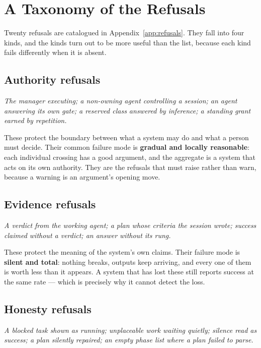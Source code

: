 \documentclass[11pt]{article}
\begin{document}
\section{A Taxonomy of the Refusals}
\label{sec:taxonomy}

Twenty refusals are catalogued in Appendix~\ref{app:refusals}. They fall into four kinds, and the kinds turn out to be more useful than the list, because each kind fails differently when it is absent.

\subsection{Authority refusals}

\emph{The manager executing; a non-owning agent controlling a session; an agent answering its own gate; a reserved class answered by inference; a standing grant earned by repetition.}

These protect the boundary between what a system may do and what a person must decide. Their common failure mode is \textbf{gradual and locally reasonable}: each individual crossing has a good argument, and the aggregate is a system that acts on its own authority. They are the refusals that must raise rather than warn, because a warning is an argument's opening move.

\subsection{Evidence refusals}

\emph{A verdict from the working agent; a plan whose criteria the session wrote; success claimed without a verdict; an answer without its rung.}

These protect the meaning of the system's own claims. Their failure mode is \textbf{silent and total}: nothing breaks, outputs keep arriving, and every one of them is worth less than it appears. A system that has lost these still reports success at the same rate --- which is precisely why it cannot detect the loss.

\subsection{Honesty refusals}

\emph{A blocked task shown as running; unplaceable work waiting quietly; silence read as success; a plan silently repaired; an empty phase list where a plan failed to parse.}
\end{document}
